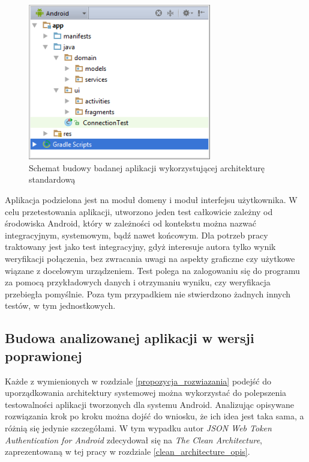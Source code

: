 \begin{figure}[!htb]
    \centering
    \includegraphics[width=8cm]{imgs/ch6_app_st.png}
    \caption
{Schemat budowy badanej aplikacji wykorzystującej architekturę standardową}
    \label{fig:app_std}
\end{figure} 

Aplikacja podzielona jest na moduł domeny i moduł interfejsu użytkownika. W celu przetestowania aplikacji, utworzono jeden test całkowicie zależny od środowiska Android, który w zależności od kontekstu można nazwać integracyjnym, systemowym, bądź nawet końcowym. Dla potrzeb pracy traktowany jest jako test integracyjny, gdyż interesuje autora tylko wynik weryfikacji połączenia, bez zwracania uwagi na aspekty graficzne czy użytkowe wiązane z docelowym urządzeniem. Test polega na zalogowaniu się do programu za pomocą przykładowych danych i otrzymaniu wyniku, czy weryfikacja przebiegła pomyślnie. Poza tym przypadkiem nie stwierdzono żadnych innych testów, w tym jednostkowych.

\subsection{Budowa analizowanej aplikacji w wersji poprawionej}
Każde z wymienionych w rozdziale \ref{propozycja_rozwiazania} podejść do uporządkowania architektury systemowej można wykorzystać do polepszenia testowalności aplikacji tworzonych dla systemu Android. Analizując opisywane rozwiązania krok po kroku można dojść do wniosku, że ich idea jest taka sama, a różnią się jedynie szczegółami. W tym wypadku autor \textit{JSON Web Token Authentication for Android} zdecydował się na \textit{The Clean Architecture}, zaprezentowaną w tej pracy w rozdziale \ref{clean_architecture_opis}.


